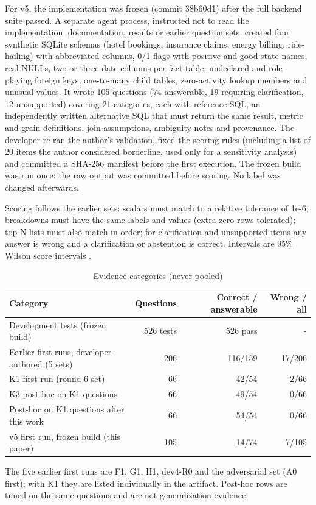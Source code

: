 \documentclass[conference]{IEEEtran}
\begin{document}
For v5, the implementation was frozen (commit 38b60d1) after the full backend suite passed. A separate agent process, instructed not to read the implementation, documentation, results or earlier question sets, created four synthetic SQLite schemas (hotel bookings, insurance claims, energy billing, ride-hailing) with abbreviated columns, 0/1 flags with positive and good-state names, real NULLs, two or three date columns per fact table, undeclared and role-playing foreign keys, one-to-many child tables, zero-activity lookup members and unusual values. It wrote 105 questions (74 answerable, 19 requiring clarification, 12 unsupported) covering 21 categories, each with reference SQL, an independently written alternative SQL that must return the same result, metric and grain definitions, join assumptions, ambiguity notes and provenance. The developer re-ran the author's validation, fixed the scoring rules (including a list of 20 items the author considered borderline, used only for a sensitivity analysis) and committed a SHA-256 manifest before the first execution. The frozen build was run once; the raw output was committed before scoring. No label was changed afterwards.

Scoring follows the earlier sets: scalars must match to a relative tolerance of 1e-6; breakdowns must have the same labels and values (extra zero rows tolerated); top-N lists must also match in order; for clarification and unsupported items any answer is wrong and a clarification or abstention is correct. Intervals are 95\% Wilson score intervals \cite{r9}.

\begin{table}[t]\centering\caption{Evidence categories (never pooled)}\footnotesize\begin{tabular}{lrrr}\toprule Category & Questions & Correct / answerable & Wrong / all \\\midrule Development tests (frozen build) & 526 tests & 526 pass & - \\
Earlier first runs, developer-authored (5 sets) & 206 & 116/159 & 17/206 \\
K1 first run (round-6 set) & 66 & 42/54 & 2/66 \\
K3 post-hoc on K1 questions & 66 & 49/54 & 0/66 \\
Post-hoc on K1 questions after this work & 66 & 54/54 & 0/66 \\
v5 first run, frozen build (this paper) & 105 & 14/74 & 7/105 \\\bottomrule\end{tabular}\end{table}
The five earlier first runs are F1, G1, H1, dev4-R0 and the adversarial set (A0 first); with K1 they are listed individually in the artifact. Post-hoc rows are tuned on the same questions and are not generalization evidence.
\end{document}
